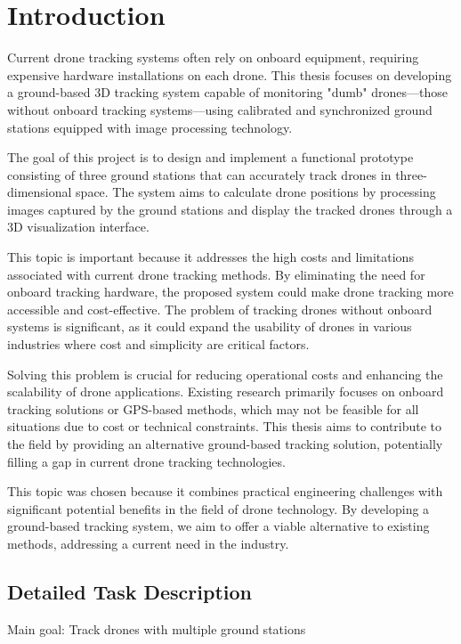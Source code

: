 \chapter{Introduction}

Current drone tracking systems often rely on onboard equipment, requiring expensive hardware installations on each drone. This thesis focuses on developing a ground-based 3D tracking system capable of monitoring "dumb" drones—those without onboard tracking systems—using calibrated and synchronized ground stations equipped with image processing technology.

The goal of this project is to design and implement a functional prototype consisting of three ground stations that can accurately track drones in three-dimensional space. The system aims to calculate drone positions by processing images captured by the ground stations and display the tracked drones through a 3D visualization interface.

This topic is important because it addresses the high costs and limitations associated with current drone tracking methods. By eliminating the need for onboard tracking hardware, the proposed system could make drone tracking more accessible and cost-effective. The problem of tracking drones without onboard systems is significant, as it could expand the usability of drones in various industries where cost and simplicity are critical factors.

Solving this problem is crucial for reducing operational costs and enhancing the scalability of drone applications. Existing research primarily focuses on onboard tracking solutions or GPS-based methods, which may not be feasible for all situations due to cost or technical constraints. This thesis aims to contribute to the field by providing an alternative ground-based tracking solution, potentially filling a gap in current drone tracking technologies.

This topic was chosen because it combines practical engineering challenges with significant potential benefits in the field of drone technology. By developing a ground-based tracking system, we aim to offer a viable alternative to existing methods, addressing a current need in the industry.

\section{Detailed Task Description}

Main goal: Track drones with multiple ground stations

